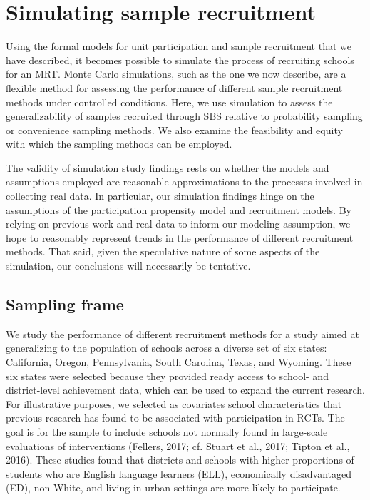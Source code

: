 \documentclass[
  english,
  man,floatsintext]{apa6}
\begin{document}
\hypertarget{simulating-sample-recruitment}{%
\section{Simulating sample recruitment}\label{simulating-sample-recruitment}}

Using the formal models for unit participation and sample recruitment that we have described, it becomes possible to simulate the process of recruiting schools for an MRT.
Monte Carlo simulations, such as the one we now describe, are a flexible method for assessing the performance of different sample recruitment methods under controlled conditions.
Here, we use simulation to assess the generalizability of samples recruited through SBS relative to probability sampling or convenience sampling methods. We also examine the feasibility and equity with which the sampling methods can be employed.

The validity of simulation study findings rests on whether the models and assumptions employed are reasonable approximations to the processes involved in collecting real data. In particular, our simulation findings hinge on the assumptions of the participation propensity model and recruitment models. By relying on previous work and real data to inform our modeling assumption, we hope to reasonably represent trends in the performance of different recruitment methods. That said, given the speculative nature of some aspects of the simulation, our conclusions will necessarily be tentative.

\hypertarget{sampling-frame}{%
\subsection{Sampling frame}\label{sampling-frame}}

We study the performance of different recruitment methods for a study aimed at generalizing to the population of schools across a diverse set of six states: California, Oregon, Pennsylvania, South Carolina, Texas, and Wyoming. These six states were selected because they provided ready access to school- and district-level achievement data, which can be used to expand the current research. For illustrative purposes, we selected as covariates school characteristics that previous research has found to be associated with participation in RCTs. The goal is for the sample to include schools not normally found in large-scale evaluations of interventions (Fellers, 2017; cf. Stuart et al., 2017; Tipton et al., 2016). These studies found that districts and schools with higher proportions of students who are English language learners (ELL), economically disadvantaged (ED), non-White, and living in urban settings are more likely to participate.
\end{document}
